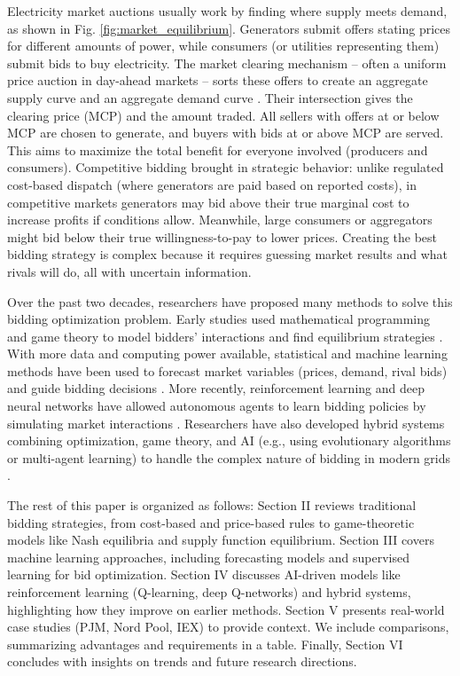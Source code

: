 \documentclass[conference]{IEEEtran}
\begin{document}
Electricity market auctions usually work by finding where supply meets demand, as shown in Fig. \ref{fig:market_equilibrium}. Generators submit offers stating prices for different amounts of power, while consumers (or utilities representing them) submit bids to buy electricity. The market clearing mechanism – often a uniform price auction in day-ahead markets – sorts these offers to create an aggregate supply curve and an aggregate demand curve \cite{KirschenStrbac2004, Wilson2002}. Their intersection gives the clearing price (MCP) and the amount traded. All sellers with offers at or below MCP are chosen to generate, and buyers with bids at or above MCP are served. This aims to maximize the total benefit for everyone involved (producers and consumers). Competitive bidding brought in strategic behavior: unlike regulated cost-based dispatch (where generators are paid based on reported costs), in competitive markets generators may bid above their true marginal cost to increase profits if conditions allow. Meanwhile, large consumers or aggregators might bid below their true willingness-to-pay to lower prices. Creating the best bidding strategy is complex because it requires guessing market results and what rivals will do, all with uncertain information.

Over the past two decades, researchers have proposed many methods to solve this bidding optimization problem. Early studies used mathematical programming and game theory to model bidders’ interactions and find equilibrium strategies \cite{Ferrero1997, Green1992}. With more data and computing power available, statistical and machine learning methods have been used to forecast market variables (prices, demand, rival bids) and guide bidding decisions \cite{Conejo2005, Shahidehpour2002}. More recently, reinforcement learning and deep neural networks have allowed autonomous agents to learn bidding policies by simulating market interactions \cite{Wang2019, Liu2021}. Researchers have also developed hybrid systems combining optimization, game theory, and AI (e.g., using evolutionary algorithms or multi-agent learning) to handle the complex nature of bidding in modern grids \cite{Gountis2004, Wang2017}.

The rest of this paper is organized as follows: Section II reviews traditional bidding strategies, from cost-based and price-based rules to game-theoretic models like Nash equilibria and supply function equilibrium. Section III covers machine learning approaches, including forecasting models and supervised learning for bid optimization. Section IV discusses AI-driven models like reinforcement learning (Q-learning, deep Q-networks) and hybrid systems, highlighting how they improve on earlier methods. Section V presents real-world case studies (PJM, Nord Pool, IEX) to provide context. We include comparisons, summarizing advantages and requirements in a table. Finally, Section VI concludes with insights on trends and future research directions.
\end{document}
